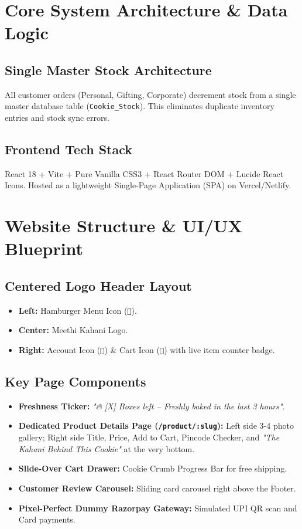 \documentclass[11pt,a4paper]{article}
\begin{document}
\section{Core System Architecture \& Data Logic}
\subsection{Single Master Stock Architecture}
All customer orders (Personal, Gifting, Corporate) decrement stock from a single master database table (\texttt{Cookie\_Stock}). This eliminates duplicate inventory entries and stock sync errors.

\subsection{Frontend Tech Stack}
React 18 + Vite + Pure Vanilla CSS3 + React Router DOM + Lucide React Icons. Hosted as a lightweight Single-Page Application (SPA) on Vercel/Netlify.

\section{Website Structure \& UI/UX Blueprint}
\subsection{Centered Logo Header Layout}
\begin{itemize}
    \item \textbf{Left:} Hamburger Menu Icon (\texttt{🍔}).
    \item \textbf{Center:} Meethi Kahani Logo.
    \item \textbf{Right:} Account Icon (\texttt{👤}) \& Cart Icon (\texttt{🛒}) with live item counter badge.
\end{itemize}

\subsection{Key Page Components}
\begin{itemize}
    \item \textbf{Freshness Ticker:} \textit{"🔥 [X] Boxes left -- Freshly baked in the last 3 hours"}.
    \item \textbf{Dedicated Product Details Page (\texttt{/product/:slug}):} Left side 3-4 photo gallery; Right side Title, Price, Add to Cart, Pincode Checker, and \textit{"The Kahani Behind This Cookie"} at the very bottom.
    \item \textbf{Slide-Over Cart Drawer:} Cookie Crumb Progress Bar for free shipping.
    \item \textbf{Customer Review Carousel:} Sliding card carousel right above the Footer.
    \item \textbf{Pixel-Perfect Dummy Razorpay Gateway:} Simulated UPI QR scan and Card payments.
\end{itemize}
\end{document}
